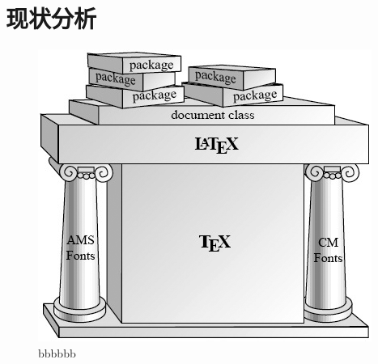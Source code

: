 \documentclass[../main]{subfiles}
\begin{document}
\chapter{现状分析}
\zhlipsum[3]
\begin{figure}[htp]
  \centering
  \includegraphics[scale=0.6]{figs/fig02-01frame}
  \caption{bbbbbb}
\end{figure}

\end{document}
